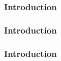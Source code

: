 \documentclass{beamer}
\begin{document}
\begin{frame}
    \frametitle{Introduction}
    \begin{minipage}{\textwidth}
    \end{minipage}
\end{frame}

\begin{frame}
    \frametitle{Introduction}
    \begin{minipage}{\textwidth}
    \end{minipage}
\end{frame}

\begin{frame}
    \frametitle{Introduction}
    \begin{minipage}{\textwidth}
    \end{minipage}
\end{frame}
\end{document}
